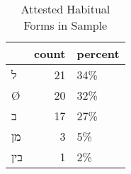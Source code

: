 \begin{table}[htbp!]
\centering
\caption{Attested Habitual Forms in Sample}
\label{table:hab_front}
\begin{tabular}{lrl}
\toprule
{} &  count & percent \\
\midrule
\texthebrew{ל}   &     21 &     34\% \\
\texthebrew{Ø}   &     20 &     32\% \\
\texthebrew{ב}   &     17 &     27\% \\
\texthebrew{מן}  &      3 &      5\% \\
\texthebrew{בין} &      1 &      2\% \\
\bottomrule
\end{tabular}
\end{table}
